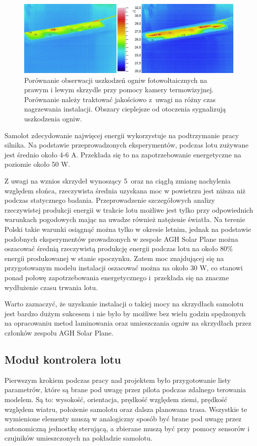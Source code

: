 \documentclass[12pt, a4paper]{article}
\begin{document}
\begin{figure}[ht]
    \centering
    \includegraphics[width=1\textwidth]{termo}
    \caption{Porównanie obserwacji uszkodzeń ogniw fotowoltaicznych na prawym i lewym skrzydle przy pomocy kamery termowizyjnej. Porównanie należy traktować jakościowo z~uwagi na różny czas nagrzewania instalacji. Obszary cieplejsze od otoczenia sygnalizują uszkodzenia ogniw.}
    \label{fig:uszkodzenia}
\end{figure}

Samolot zdecydowanie najwięcej energii wykorzystuje na podtrzymanie pracy silnika. Na podstawie przeprowadzonych eksperymentów, podczas lotu zużywane jest średnio około 4-6 A. Przekłada się to na zapotrzebowanie energetyczne na poziomie około 50 W. 

Z uwagi na wznios skrzydeł wynoszący 5\textdegree\ oraz na ciągłą zmianę nachylenia względem słońca, rzeczywista średnia uzyskana moc w powietrzu jest niższa niż podczas statycznego badania. Przeprowadzenie szczegółowych analizy rzeczywistej produkcji energii w trakcie lotu możliwe jest tylko przy odpowiednich warunkach pogodowych mając na uwadze również natężenie światła. Na terenie Polski takie warunki osiągnąć można tylko w okresie letnim, jednak na podstawie podobnych eksperymentów prowadzonych w zespole AGH Solar Plane można oszacować średnią rzeczywistą produkcję energii podczas lotu na około 80\% energii produkowanej w stanie spoczynku. Zatem moc znajdującej się na przygotowanym modelu instalacji oszacować można na około 30 W, co stanowi ponad połowę zapotrzebowania energetycznego i~przekłada się na znaczne wydłużenie czasu trwania lotu.

Warto zaznaczyć, że uzyskanie instalacji o takiej mocy na skrzydłach samolotu jest bardzo dużym sukcesem i nie było by możliwe bez wielu godzin spędzonych na opracowaniu metod laminowania oraz umieszczania ogniw na skrzydłach przez członków zespołu AGH Solar Plane.

\FloatBarrier
\subsection{Moduł kontrolera lotu}
Pierwszym krokiem podczas pracy nad projektem  było przygotowanie listy parametrów, które są brane pod uwagę przez pilota podczas zdalnego terowania modelem. Są to: wysokość, orientacja, prędkość względem ziemi, prędkość względem wiatru, położenie samolotu oraz dalsza planowana trasa. Wszystkie te wymienione elementy muszą w analogiczny sposób być brane pod uwagę przez autonomiczną jednostkę sterującą, a zbierane muszą być przy pomocy sensorów i czujników umieszczonych na pokładzie samolotu. 
\end{document}
